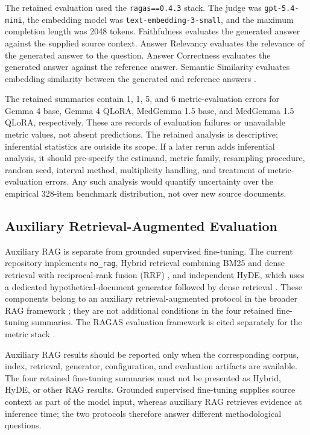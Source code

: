 The retained evaluation used the \texttt{ragas==0.4.3} stack. The judge was \texttt{gpt-5.4-mini}, the embedding model was \texttt{text-embedding-3-small}, and the maximum completion length was 2048 tokens. Faithfulness evaluates the generated answer against the supplied source context. Answer Relevancy evaluates the relevance of the generated answer to the question. Answer Correctness evaluates the generated answer against the reference answer. Semantic Similarity evaluates embedding similarity between the generated and reference answers \cite{Es2023Ragas}.

The retained summaries contain 1, 1, 5, and 6 metric-evaluation errors for Gemma 4 base, Gemma 4 QLoRA, MedGemma 1.5 base, and MedGemma 1.5 QLoRA, respectively. These are records of evaluation failures or unavailable metric values, not absent predictions. The retained analysis is descriptive; inferential statistics are outside its scope. If a later rerun adds inferential analysis, it should pre-specify the estimand, metric family, resampling procedure, random seed, interval method, multiplicity handling, and treatment of metric-evaluation errors. Any such analysis would quantify uncertainty over the empirical 328-item benchmark distribution, not over new source documents.

\subsection{Auxiliary Retrieval-Augmented Evaluation}

Auxiliary RAG is separate from grounded supervised fine-tuning. The current repository implements \texttt{no\_rag}, Hybrid retrieval combining BM25 and dense retrieval with reciprocal-rank fusion (RRF) \cite{Cormack2009RRF}, and independent HyDE, which uses a dedicated hypothetical-document generator followed by dense retrieval \cite{Gao2023HyDE}. These components belong to an auxiliary retrieval-augmented protocol in the broader RAG framework \cite{Lewis2020RAG}; they are not additional conditions in the four retained fine-tuning summaries. The RAGAS evaluation framework is cited separately for the metric stack \cite{Es2023Ragas}.

Auxiliary RAG results should be reported only when the corresponding corpus, index, retrieval, generator, configuration, and evaluation artifacts are available. The four retained fine-tuning summaries must not be presented as Hybrid, HyDE, or other RAG results. Grounded supervised fine-tuning supplies source context as part of the model input, whereas auxiliary RAG retrieves evidence at inference time; the two protocols therefore answer different methodological questions.

